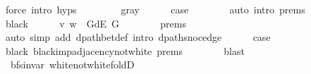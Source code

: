 \begin{isabellebody}
\ {\isacharparenleft}{\kern0pt}force\ intro{\isacharcolon}{\kern0pt}\ {\isachardoublequoteopen}{}{\isachardot}{\kern0pt}hyps{\isachardoublequoteclose}{\isacharparenright}{\kern0pt}\isanewline
\ \ \isamarkupfalse%
\isanewline
\ \ \ \ \isamarkupfalse%
\ gray\isanewline
\ \ \ \ \isamarkupfalse%
\ {\isacharquery}{\kern0pt}case\isanewline
\ \ \ \ \ \ \isamarkupfalse%
\ {\isacharparenleft}{\kern0pt}auto\ intro{\isacharcolon}{\kern0pt}\ {\isachardoublequoteopen}{}{\isachardot}{\kern0pt}prems{\isachardoublequoteclose}{\isacharparenleft}{\kern0pt}{}{\isacharparenright}{\kern0pt}{\isacharparenright}{\kern0pt}\isanewline
\ \ \isamarkupfalse%
\isanewline
\ \ \ \ \isamarkupfalse%
\ black\isanewline
\ \ \ \ \isamarkupfalse%
\ {\isachardoublequoteopen}{\isacharparenleft}{\kern0pt}v{\isacharcomma}{\kern0pt}\ w{\isacharparenright}{\kern0pt}\ {\isasymin}\ G{\isachardot}{\kern0pt}dE\ G{\isachardoublequoteclose}\isanewline
\ \ \ \ \ \ \isamarkupfalse%
\ {\isachardoublequoteopen}{}{\isachardot}{\kern0pt}prems{\isachardoublequoteclose}{\isacharparenleft}{\kern0pt}{}{\isacharparenright}{\kern0pt}\isanewline
\ \ \ \ \ \ \isamarkupfalse%
\ {\isacharparenleft}{\kern0pt}auto\ simp\ add{\isacharcolon}{\kern0pt}\ dpath{\isacharunderscore}{\kern0pt}bet{\isacharunderscore}{\kern0pt}def\ intro{\isacharcolon}{\kern0pt}\ dpath{\isacharunderscore}{\kern0pt}snoc{\isacharunderscore}{\kern0pt}edge{\isacharunderscore}{\kern0pt}{}{\isacharparenright}{\kern0pt}\isanewline
\ \ \ \ \isamarkupfalse%
\ {\isacharquery}{\kern0pt}case\isanewline
\ \ \ \ \ \ \isamarkupfalse%
\ black\ black{\isacharunderscore}{\kern0pt}imp{\isacharunderscore}{\kern0pt}adjacency{\isacharunderscore}{\kern0pt}not{\isacharunderscore}{\kern0pt}white\ {\isachardoublequoteopen}{}{\isachardot}{\kern0pt}prems{\isachardoublequoteclose}{\isacharparenleft}{\kern0pt}{}{\isacharparenright}{\kern0pt}\isanewline
\ \ \ \ \ \ \isamarkupfalse%
\ blast\isanewline
\ \ \isamarkupfalse%
\isanewline
{}\isamarkupfalse%
%
\endisatagvisible
{\isafoldvisible}%
%
\isadelimvisible
\isanewline
%
\endisadelimvisible
%
\isadeliminvisible
\isanewline
%
\endisadeliminvisible
%
\isataginvisible
{}\isamarkupfalse%
\ {\isacharparenleft}{\kern0pt}\ bfs{\isacharunderscore}{\kern0pt}invar{\isacharparenright}{\kern0pt}\ white{\isacharunderscore}{\kern0pt}not{\isacharunderscore}{\kern0pt}white{\isacharunderscore}{\kern0pt}foldD{\isacharcolon}{\kern0pt}\isanewline

\end{isabellebody}
